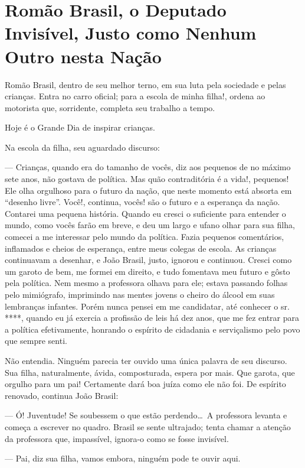 \chapter{Romão Brasil, o Deputado Invisível, Justo como Nenhum Outro nesta Nação}

Romão Brasil, dentro de seu melhor terno, em sua luta pela sociedade e pelas crianças. Entra no carro oficial; para a escola de minha filha!, ordena ao motorista que, sorridente, completa seu trabalho a tempo.

Hoje é o Grande Dia de inspirar crianças.

Na escola da filha, seu aguardado discurso:

--- Crianças, quando era do tamanho de vocês, diz aos pequenos de no máximo sete anos, não gostava de política. Mas quão contraditória é a vida!, pequenos! Ele olha orgulhoso para o futuro da nação, que neste momento está absorta em ``desenho livre''. Você!, continua, vocês! são o futuro e a esperança da nação. Contarei uma pequena história. Quando eu cresci o suficiente para entender o mundo, como vocês farão em breve, e deu um largo e ufano olhar para sua filha, comecei a me interessar pelo mundo da política. Fazia pequenos comentários, inflamados e cheios de esperança, entre meus colegas de escola. As crianças continuavam a desenhar, e João Brasil, justo, ignorou e continuou. Cresci como um garoto de bem, me formei em direito, e tudo fomentava meu futuro e gôsto pela política. Nem mesmo a professora olhava para ele; estava passando folhas pelo mimiógrafo, imprimindo nas mentes jovens o cheiro do álcool em suas lembranças infantes. Porém nunca pensei em me candidatar, até conhecer o sr. ****, quando eu já exercia a profissão de leis há dez anos, que me fez entrar para a política efetivamente, honrando o espírito de cidadania e serviçalismo pelo povo que sempre senti.

Não entendia. Ninguém parecia ter ouvido uma única palavra de seu discurso. Sua filha, naturalmente, ávida, composturada, espera por mais. Que garota, que orgulho para um pai! Certamente dará boa juíza como ele não foi. De espírito renovado, continua João Brasil:

--- Ó! Juventude! Se soubessem o que estão perdendo\ldots\ A professora levanta e começa a escrever no quadro. Brasil se sente ultrajado; tenta chamar a atenção da professora que, impassível, ignora-o como se fosse invisível.

--- Pai, diz sua filha, vamos embora, ninguém pode te ouvir aqui.

